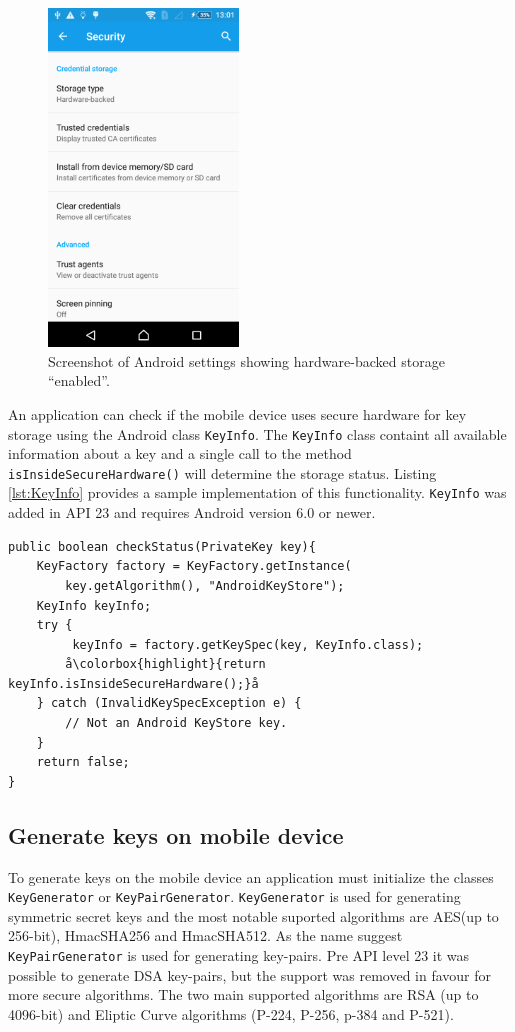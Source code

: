 \begin{figure}[h!]
  \caption{Screenshot of Android settings showing hardware-backed storage ``enabled''.}
  \label{fig:hardwareBacked}
  \centering
    \includegraphics[width=0.45\textwidth]{images/hardwareBacked.png}
\end{figure}

An application can check if the mobile device uses secure hardware for key storage using the Android class \texttt{KeyInfo}. The \texttt{KeyInfo} class containt all available information about a key and a single call to the method \texttt{isInsideSecureHardware()} will determine the storage status. Listing \ref{lst:KeyInfo} provides a sample implementation of this functionality. \texttt{KeyInfo} was added in API 23 and requires Android version 6.0 or newer.

\begin{lstlisting}[caption=Obtaining storage status of keys using KeyInfo., label=lst:KeyInfo,escapechar=å]
public boolean checkStatus(PrivateKey key){
    KeyFactory factory = KeyFactory.getInstance(
        key.getAlgorithm(), "AndroidKeyStore");
    KeyInfo keyInfo;
    try {
         keyInfo = factory.getKeySpec(key, KeyInfo.class);
        å\colorbox{highlight}{return keyInfo.isInsideSecureHardware();}å
    } catch (InvalidKeySpecException e) {
        // Not an Android KeyStore key.
    }
    return false;
}
\end{lstlisting}

\subsection{Generate keys on mobile device}
To generate keys on the mobile device an application must initialize the classes \texttt{KeyGenerator} or \texttt{KeyPairGenerator}. \texttt{KeyGenerator} is used for generating symmetric secret keys and the most notable suported algorithms are AES(up to 256-bit), HmacSHA256 and HmacSHA512. As the name suggest \texttt{KeyPairGenerator} is used for generating key-pairs. Pre API level 23 it was possible to generate DSA key-pairs, but the support was removed in favour for more secure algorithms. The two main supported algorithms are RSA (up to 4096-bit) and Eliptic Curve algorithms (P-224, P-256, p-384 and P-521).

